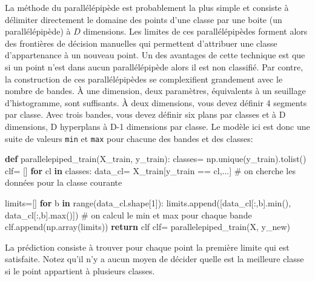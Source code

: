\documentclass[
  french,
  11pt,
  letterpaper,
  open=any,
  twoside=false,
  french]{scrbook}
\newenvironment{Shaded}{\begin{snugshade}}{\end{snugshade}}
\newcommand{\BuiltInTok}[1]{\textcolor[rgb]{0.00,0.23,0.31}{#1}}
\newcommand{\CommentTok}[1]{\textcolor[rgb]{0.37,0.37,0.37}{#1}}
\newcommand{\ControlFlowTok}[1]{\textcolor[rgb]{0.00,0.23,0.31}{\textbf{#1}}}
\newcommand{\DecValTok}[1]{\textcolor[rgb]{0.68,0.00,0.00}{#1}}
\newcommand{\KeywordTok}[1]{\textcolor[rgb]{0.00,0.23,0.31}{\textbf{#1}}}
\newcommand{\NormalTok}[1]{\textcolor[rgb]{0.00,0.23,0.31}{#1}}
\newcommand{\OperatorTok}[1]{\textcolor[rgb]{0.37,0.37,0.37}{#1}}
\begin{document}
La méthode du parallélépipède est probablement la plus simple et
consiste à délimiter directement le domaine des points d'une classe par
une boite (un parallélépipède) à \(D\) dimensions. Les limites de ces
parallélépipèdes forment alors des frontières de décision manuelles qui
permettent d'attribuer une classe d'appartenance à un nouveau point. Un
des avantages de cette technique est que si un point n'est dans aucun
parallélépipède alors il est non classifié. Par contre, la construction
de ces parallélépipèdes se complexifient grandement avec le nombre de
bandes. À une dimension, deux paramètres, équivalents à un seuillage
d'histogramme, sont suffisants. À deux dimensions, vous devez définir 4
segments par classe. Avec trois bandes, vous devez définir six plans par
classes et à D dimensions, D hyperplans à D-1 dimensions par classe. Le
modèle ici est donc une suite de valeurs \texttt{min} et \texttt{max}
pour chacune des bandes et des classes:

\begin{Shaded}
\begin{Highlighting}[]
\KeywordTok{def}\NormalTok{ parallelepiped\_train(X\_train, y\_train):}
\NormalTok{  classes}\OperatorTok{=}\NormalTok{ np.unique(y\_train).tolist()}
\NormalTok{  clf}\OperatorTok{=}\NormalTok{ []}
  \ControlFlowTok{for}\NormalTok{ cl }\KeywordTok{in}\NormalTok{ classes:}
\NormalTok{      data\_cl}\OperatorTok{=}\NormalTok{ X\_train[y\_train }\OperatorTok{==}\NormalTok{ cl,...] }\CommentTok{\# on cherche les données pour la classe courante}
      
\NormalTok{      limits}\OperatorTok{=}\NormalTok{[]}
      \ControlFlowTok{for}\NormalTok{ b }\KeywordTok{in} \BuiltInTok{range}\NormalTok{(data\_cl.shape[}\DecValTok{1}\NormalTok{]):}
\NormalTok{        limits.append([data\_cl[:,b].}\BuiltInTok{min}\NormalTok{(), data\_cl[:,b].}\BuiltInTok{max}\NormalTok{()]) }\CommentTok{\# on calcul le min et max pour chaque bande}
\NormalTok{      clf.append(np.array(limits))}
  \ControlFlowTok{return}\NormalTok{ clf}
\NormalTok{clf}\OperatorTok{=}\NormalTok{ parallelepiped\_train(X, y\_new)}
\end{Highlighting}
\end{Shaded}

La prédiction consiste à trouver pour chaque point la première limite
qui est satisfaite. Notez qu'il n'y a aucun moyen de décider quelle est
la meilleure classe si le point appartient à plusieurs classes.
\end{document}
